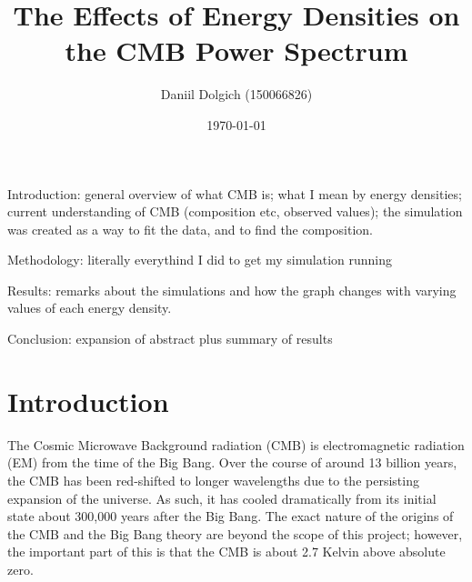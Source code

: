 \documentclass[twoside, fontsize=12pt,
     bibliography=totoc, %
     listof=totoc, %
     index=totoc, %
     onehalfspacing %
]{_MScDiss2017_cls}
\title{The Effects of Energy Densities on the CMB Power Spectrum}
\author{Daniil Dolgich (150066826)}
\date{\today}
\begin{document}
\setcounter{tocdepth}{5}

\maketitle
{}
\tableofcontents %
\listoffigures %
\lstlistoflistings %
Introduction: general overview of what CMB is; what I mean by energy densities; current understanding of CMB (composition etc, observed values); the simulation was created as a way to fit the data, and to find the composition.


Methodology: literally everythind I did to get my simulation running


Results: remarks about the simulations and how the graph changes with varying values of each energy density.


Conclusion: expansion of abstract plus summary of results

\newpage%
\cleardoublepage
{}%


\chapter{Introduction}
The Cosmic Microwave Background radiation (CMB) is electromagnetic radiation (EM) from the time of the Big Bang. Over the course of around 13 billion years, the CMB has been red-shifted to longer wavelengths due to the persisting expansion of the universe. As such, it has cooled dramatically from its initial state about 300,000 years after the Big Bang. The exact nature of the origins of the CMB and the Big Bang theory are beyond the scope of this project; however, the important part of this is that the CMB is about 2.7 Kelvin above absolute zero.
\end{document}
